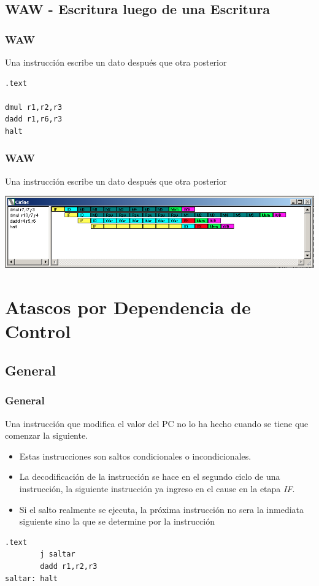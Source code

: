 \documentclass{beamer}
\begin{document}
\subsection{WAW - Escritura luego de una Escritura}
\begin{frame}[fragile]
\frametitle{WAW}
Una instrucción escribe un dato después que otra posterior
\begin{block}{}
\begin{lstlisting}[language=WinMIPS64,basicstyle=\ttfamily,keywordstyle=\color{blue}]
.text

dmul r1,r2,r3
dadd r1,r6,r3
halt
\end{lstlisting}
\end{block}

\end{frame}


\begin{frame}[fragile]
\frametitle{WAW}
Una instrucción escribe un dato después que otra posterior
\begin{block}{}
\includegraphics[scale=0.45]{war.png}
\end{block}
\end{frame}

\section{Atascos por Dependencia de Control}
\subsection{General}
\begin{frame}[fragile]
\frametitle{General}
Una instrucción que modifica el valor del PC no lo ha hecho cuando se tiene que comenzar la siguiente.
\begin{itemize}
\item Estas instrucciones son saltos condicionales o incondicionales.
\item La decodificación de la instrucción se hace en el segundo ciclo de una instrucción, la siguiente instrucción ya ingreso en el cause en la etapa \emph{IF}.
\item Si el salto realmente se ejecuta, la próxima instrucción no sera la inmediata siguiente sino la que se determine por la instrucción
\end{itemize}
\begin{block}{}
\begin{lstlisting}[language=WinMIPS64,basicstyle=\ttfamily,keywordstyle=\color{blue}]
        .text
        j saltar
        dadd r1,r2,r3
saltar: halt
\end{lstlisting}
\end{block}
\end{frame}
\end{document}
